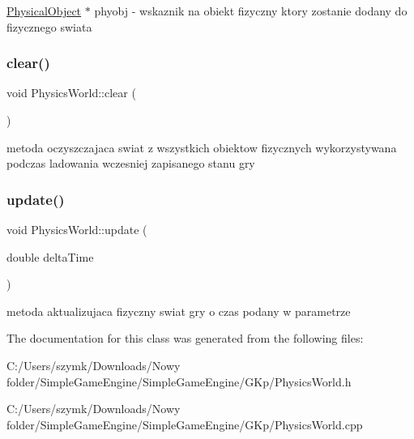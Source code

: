 \hyperlink{class_physical_object}{Physical\+Object} $\ast$ phyobj -\/ wskaznik na obiekt fizyczny ktory zostanie dodany do fizycznego swiata \mbox{\label{class_physics_world_a948724c83bcd3d69a0977b5c9e2b9ac4}} 
\subsubsection{\texorpdfstring{clear()}{clear()}}
{\footnotesize\ttfamily void Physics\+World\+::clear (\begin{DoxyParamCaption}{ }\end{DoxyParamCaption})}



metoda oczyszczajaca swiat z wszystkich obiektow fizycznych wykorzystywana podczas ladowania wczesniej zapisanego stanu gry 

\mbox{\label{class_physics_world_aebc88d1b3c209a48c2abf0c8a4aabd51}} 
\subsubsection{\texorpdfstring{update()}{update()}}
{\footnotesize\ttfamily void Physics\+World\+::update (\begin{DoxyParamCaption}\item[{double}]{delta\+Time }\end{DoxyParamCaption})}



metoda aktualizujaca fizyczny swiat gry o czas podany w parametrze 



The documentation for this class was generated from the following files\+:\begin{DoxyCompactItemize}
\item 
C\+:/\+Users/szymk/\+Downloads/\+Nowy folder/\+Simple\+Game\+Engine/\+Simple\+Game\+Engine/\+G\+Kp/Physics\+World.\+h\item 
C\+:/\+Users/szymk/\+Downloads/\+Nowy folder/\+Simple\+Game\+Engine/\+Simple\+Game\+Engine/\+G\+Kp/Physics\+World.\+cpp\end{DoxyCompactItemize}
